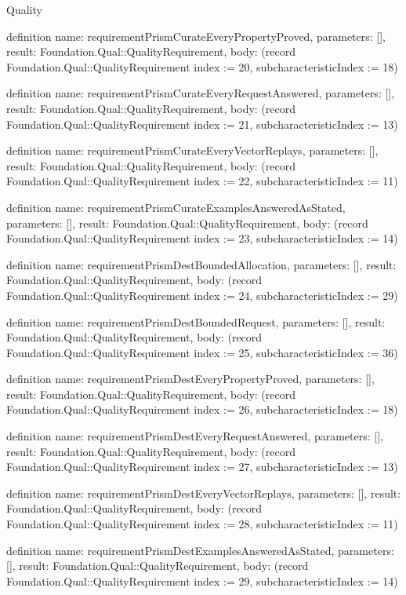 \begin{lexlean}{Quality}
\begin{semanticmodule}
definition{
  name: requirementPrismCurateEveryPropertyProved,
  parameters: [],
  result: Foundation.Qual::QualityRequirement,
  body: (record Foundation.Qual::QualityRequirement {index := 20, subcharacteristicIndex := 18})
}

definition{
  name: requirementPrismCurateEveryRequestAnswered,
  parameters: [],
  result: Foundation.Qual::QualityRequirement,
  body: (record Foundation.Qual::QualityRequirement {index := 21, subcharacteristicIndex := 13})
}

definition{
  name: requirementPrismCurateEveryVectorReplays,
  parameters: [],
  result: Foundation.Qual::QualityRequirement,
  body: (record Foundation.Qual::QualityRequirement {index := 22, subcharacteristicIndex := 11})
}

definition{
  name: requirementPrismCurateExamplesAnsweredAsStated,
  parameters: [],
  result: Foundation.Qual::QualityRequirement,
  body: (record Foundation.Qual::QualityRequirement {index := 23, subcharacteristicIndex := 14})
}

definition{
  name: requirementPrismDestBoundedAllocation,
  parameters: [],
  result: Foundation.Qual::QualityRequirement,
  body: (record Foundation.Qual::QualityRequirement {index := 24, subcharacteristicIndex := 29})
}

definition{
  name: requirementPrismDestBoundedRequest,
  parameters: [],
  result: Foundation.Qual::QualityRequirement,
  body: (record Foundation.Qual::QualityRequirement {index := 25, subcharacteristicIndex := 36})
}

definition{
  name: requirementPrismDestEveryPropertyProved,
  parameters: [],
  result: Foundation.Qual::QualityRequirement,
  body: (record Foundation.Qual::QualityRequirement {index := 26, subcharacteristicIndex := 18})
}

definition{
  name: requirementPrismDestEveryRequestAnswered,
  parameters: [],
  result: Foundation.Qual::QualityRequirement,
  body: (record Foundation.Qual::QualityRequirement {index := 27, subcharacteristicIndex := 13})
}

definition{
  name: requirementPrismDestEveryVectorReplays,
  parameters: [],
  result: Foundation.Qual::QualityRequirement,
  body: (record Foundation.Qual::QualityRequirement {index := 28, subcharacteristicIndex := 11})
}

definition{
  name: requirementPrismDestExamplesAnsweredAsStated,
  parameters: [],
  result: Foundation.Qual::QualityRequirement,
  body: (record Foundation.Qual::QualityRequirement {index := 29, subcharacteristicIndex := 14})
}


\end{semanticmodule}
\end{lexlean}

